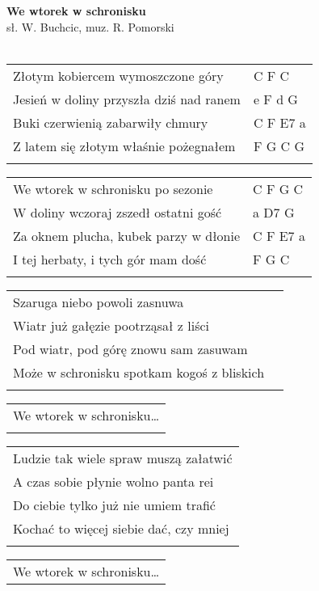 \documentclass[a5paper]{article}
\begin{document}


\noindent
\fontsize{12pt}{15pt}\selectfont
\textbf{We wtorek w schronisku} \\
\fontsize{8pt}{10pt}\selectfont
sł. W. Buchcic, muz. R. Pomorski \\ \\
\fontsize{10pt}{12pt}\selectfont
{}
\begin{tabular}{@{}p{8.50cm}p{3cm}@{}}
\noindent
Złotym kobiercem wymoszczone góry & C F C \\
Jesień w doliny przyszła dziś nad ranem & e F d G\\ 
Buki czerwienią zabarwiły chmury & C F E7 a \\
Z latem się złotym właśnie pożegnałem & F G C G \\ \\
\end{tabular}

\noindent
\begin{tabular}{@{}p{7.50cm}p{3cm}@{}}
We wtorek w schronisku po sezonie & C F G C \\
W doliny wczoraj zszedł ostatni gość & a D7 G \\
Za oknem plucha, kubek parzy w dłonie & C F E7 a \\
I tej herbaty, i tych gór mam dość & F G C \\ \\
\end{tabular}

\noindent
\begin{tabular}{@{}p{8.50cm}p{3cm}@{}}
Szaruga niebo powoli zasnuwa \\
Wiatr już gałęzie pootrząsał z liści \\
Pod wiatr, pod górę znowu sam zasuwam \\
Może w schronisku spotkam kogoś z bliskich \\ \\
\end{tabular}

\noindent
\begin{tabular}{@{}p{7.50cm}@{}}
We wtorek w schronisku… \\ \\
\end{tabular}

\noindent
\begin{tabular}{@{}p{8.50cm}@{}}
Ludzie tak wiele spraw muszą załatwić \\
A czas sobie płynie wolno panta rei \\
Do ciebie tylko już nie umiem trafić \\
Kochać to więcej siebie dać, czy mniej \\ \\
\end{tabular}

\noindent
\begin{tabular}{@{}p{7.50cm}@{}}
We wtorek w schronisku…
\end{tabular}
\end{document}
